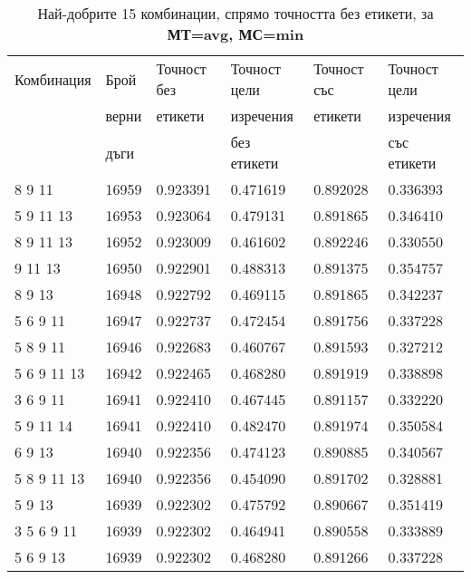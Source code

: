 \begin{table}[!htb] 
\caption{Най-добрите 15 комбинации, спрямо точността без етикети, за \textbf{МТ=avg, МС=min}}
  \begin{tabular}{|l|l|l|l|l|l|}
\hline 
Комбинация & Брой  & Точност без  & Точност цели  & Точност със  & Точност цели  \\
 & верни	& етикети & изречения & етикети & изречения \\
 & дъги	& 	& без етикети & 	& със етикети \\
\hline 
8 9 11 &	16959 &	0.923391 &	0.471619 &	0.892028 &	0.336393\\ 
\hline 
5 9 11 13 &	16953 &	0.923064 &	0.479131 &	0.891865 &	0.346410\\ 
\hline 
8 9 11 13 &	16952 &	0.923009 &	0.461602 &	0.892246 &	0.330550\\ 
\hline 
9 11 13 &	16950 &	0.922901 &	0.488313 &	0.891375 &	0.354757\\ 
\hline 
8 9 13 &	16948 &	0.922792 &	0.469115 &	0.891865 &	0.342237\\ 
\hline 
5 6 9 11 &	16947 &	0.922737 &	0.472454 &	0.891756 &	0.337228\\ 
\hline 
5 8 9 11 &	16946 &	0.922683 &	0.460767 &	0.891593 &	0.327212\\ 
\hline 
5 6 9 11 13 &	16942 &	0.922465 &	0.468280 &	0.891919 &	0.338898\\ 
\hline 
3 6 9 11 &	16941 &	0.922410 &	0.467445 &	0.891157 &	0.332220\\ 
\hline 
5 9 11 14 &	16941 &	0.922410 &	0.482470 &	0.891974 &	0.350584\\ 
\hline 
6 9 13 &	16940 &	0.922356 &	0.474123 &	0.890885 &	0.340567\\ 
\hline 
5 8 9 11 13 &	16940 &	0.922356 &	0.454090 &	0.891702 &	0.328881\\ 
\hline 
5 9 13 &	16939 &	0.922302 &	0.475792 &	0.890667 &	0.351419\\ 
\hline 
3 5 6 9 11 &	16939 &	0.922302 &	0.464941 &	0.890558 &	0.333889\\ 
\hline 
5 6 9 13 &	16939 &	0.922302 &	0.468280 &	0.891266 &	0.337228\\ 
\hline 
 \end{tabular}
 \label{tab:lab_min_avg}
 \end{table}
